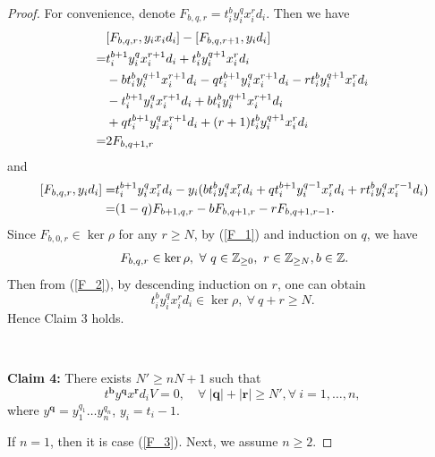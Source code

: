 \documentclass[12pt,a4paper]{amsart}
\numberwithin{equation}{section}
\newcommand{\Z}{\mathbb{Z}}
\begin{document}
\begin{proof}
For convenience, denote $F_{b,q,r}=t_i^by_i^qx_i^rd_i$. Then we have
\begin{equation}\label{F_1}
\aligned \
&[F_{b,q,r},y_ix_id_i]-[F_{b,q,r+1},y_id_i]\\
=&t_i^{b+1}y_i^qx_i^{r+1}d_i+t_i^{b}y_i^{q+1}x_i^{r}d_i\\
&-bt_i^{b}y_i^{q+1}x_i^{r+1}d_i-qt_i^{b+1}y_i^{q}x_i^{r+1}d_i
-rt_i^{b}y_i^{q+1}x_i^{r}d_i\\
&-t_i^{b+1}y_i^{q}x_i^{r+1}d_i+bt_i^{b}y_i^{q+1}x_i^{r+1}d_i\\
&+qt_i^{b+1}y_i^{q}x_i^{r+1}d_i+(r+1)t_i^{b}y_i^{q+1}x_i^{r}d_i\\
=&2F_{b,q+1,r}
\endaligned
\end{equation}
and
\begin{equation}\label{F_2}
\aligned \
[F_{b,q,r},y_id_i]=&t_i^{b+1}y_i^{q}x_i^{r}d_i-y_i(bt_i^{b}y_i^{q}x_i^{r}d_i+qt_i^{b+1}y_i^{q-1}x_i^{r}d_i+rt_i^{b}y_i^{q}x_i^{r-1}d_i)\\
=&(1-q)F_{b+1,q,r}-bF_{b,q+1,r}-rF_{b,q+1,r-1}.
\endaligned
\end{equation}
Since $F_{b,0,r}\in \ker\rho$ for any $r\geq N$, by (\ref{F_1}) and induction on $q$,  we have
$$\aligned \
F_{b,q,r}\in \ker\rho, \ \forall\ q\in \Z_{\geq 0}, \ r\in \Z_{\geq N}, b\in \Z.
\endaligned$$
Then  from (\ref{F_2}), by descending induction on $r$, one can obtain
\begin{equation}\label{F_3}
t_i^by_i^qx_i^rd_i\in \ker\rho, \ \forall\  q+r\geq N.
\end{equation}
Hence Claim 3 holds.

\

\noindent \textbf{Claim 4:}
There exists $N'\geq nN+1$ such that
\begin{equation} t^{\mathbf{b}}y^{\mathbf{q}}x^{\mathbf{r}}d_i V=0,\quad \forall\ |\mathbf{q}|+|\mathbf{r}|\geq N', \forall\ i=1,\dots,n, \end{equation}
where $y^{\mathbf{q}}=y_1^{q_1}\dots y_n^{q_n}$, $y_i=t_i-1$.

If $n=1$, then it is case (\ref{F_3}). Next, we assume $n\geq 2$. %



\end{proof}
\end{document}
